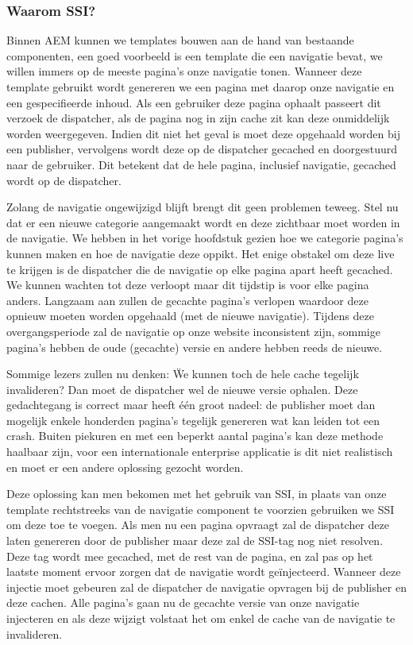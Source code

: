 	\subsubsection{Waarom SSI?}
    Binnen AEM kunnen we templates bouwen aan de hand van bestaande componenten, een goed voorbeeld is een template die een navigatie bevat, we willen immers op de meeste pagina's onze navigatie tonen. Wanneer deze template gebruikt wordt genereren we een pagina met daarop onze navigatie en een gespecifieerde inhoud. Als een gebruiker deze pagina ophaalt passeert dit verzoek de dispatcher, als de pagina nog in zijn cache zit kan deze onmiddelijk worden weergegeven. Indien dit niet het geval is moet deze opgehaald worden bij een publisher, vervolgens wordt deze op de dispatcher gecached en doorgestuurd naar de gebruiker. Dit betekent dat de hele pagina, inclusief navigatie, gecached wordt op de dispatcher. 
    \par
    Zolang de navigatie ongewijzigd blijft brengt dit geen problemen teweeg. Stel nu dat er een nieuwe categorie aangemaakt wordt en deze zichtbaar moet worden in de navigatie. We hebben in het vorige hoofdstuk gezien hoe we categorie pagina's kunnen maken en hoe de navigatie deze oppikt. Het enige obstakel om deze live te krijgen is de dispatcher die de navigatie op elke pagina apart heeft gecached. We kunnen wachten tot deze verloopt maar dit tijdstip is voor elke pagina anders. Langzaam aan zullen de gecachte pagina's verlopen waardoor deze opnieuw moeten worden opgehaald (met de nieuwe navigatie). Tijdens deze overgangsperiode zal de navigatie op onze website inconsistent zijn, sommige pagina's hebben de oude (gecachte) versie en andere hebben reeds de nieuwe.
    \par
    Sommige lezers zullen nu denken: \"We kunnen toch de hele cache tegelijk invalideren? Dan moet de dispatcher wel de nieuwe versie ophalen. Deze gedachtegang is correct maar heeft \'e\'en groot nadeel: de publisher moet dan mogelijk enkele honderden pagina's tegelijk genereren wat kan leiden tot een crash. Buiten piekuren en met een beperkt aantal pagina's kan deze methode haalbaar zijn, voor een internationale enterprise applicatie is dit niet realistisch en moet er een andere oplossing gezocht worden.
    \par
    Deze oplossing kan men bekomen met het gebruik van SSI, in plaats van onze template rechtstreeks van de navigatie component te voorzien gebruiken we SSI om deze toe te voegen. Als men nu een pagina opvraagt zal de dispatcher deze laten genereren door de publisher maar deze zal de SSI-tag nog niet resolven. Deze tag wordt mee gecached, met de rest van de pagina, en zal pas op het laatste moment ervoor zorgen dat de navigatie wordt ge\"injecteerd. Wanneer deze injectie moet gebeuren zal de dispatcher de navigatie opvragen bij de publisher en deze cachen. Alle pagina's gaan nu de gecachte versie van onze navigatie injecteren en als deze wijzigt volstaat het om enkel de cache van de navigatie te invalideren.
